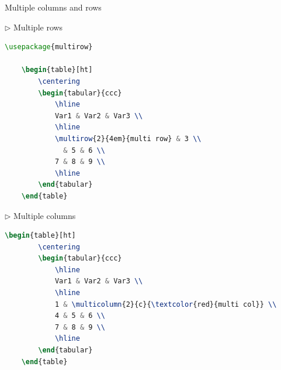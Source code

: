 \documentclass{beamer}
\begin{document}
\begin{frame}[containsverbatim]{Multiple columns and rows}
	\begin{multicols}{2}
	\noindent  
	$\triangleright$ Multiple rows
	\begin{lstlisting}[language=TeX, basicstyle=\tiny]
	\usepackage{multirow}
	
	\begin{table}[ht]
		\centering
		\begin{tabular}{ccc}
			\hline  
			Var1 & Var2 & Var3 \\ 
			\hline
			\multirow{2}{4em}{multi row} & 3 \\
			  & 5 & 6 \\
			7 & 8 & 9 \\
			\hline
		\end{tabular}
	\end{table}   \end{lstlisting}
	
	\columnbreak
	
	$\triangleright$ Multiple columns
	\begin{lstlisting}[language=TeX, basicstyle=\tiny]
	\begin{table}[ht]
		\centering
		\begin{tabular}{ccc}
			\hline 
			Var1 & Var2 & Var3 \\ 
			\hline
			1 & \multicolumn{2}{c}{\textcolor{red}{multi col}} \\
			4 & 5 & 6 \\
			7 & 8 & 9 \\
			\hline
		\end{tabular}
	\end{table}   \end{lstlisting}
	\end{multicols}
\end{frame}
\end{document}
